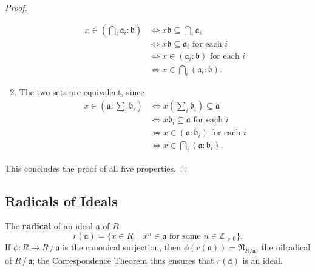 \documentclass[11pt]{article}
\begin{document}
\begin{adjustwidth}{0.5cm}{}
\begin{proof}
\begin{enumerate}
\begin{align*}
				x \in \left( \bigcap_{i} \mathfrak{a}_{i} : \mathfrak{b} \right) &\iff x \mathfrak{b} \subseteq \bigcap\limits_{i} \mathfrak{a}_{i} \\
				&\iff x \mathfrak{b} \subseteq \mathfrak{a}_{i} \text{ for each } i \\
				&\iff x \in (\mathfrak{a}_{i} : \mathfrak{b}) \text{ for each } i \\
				&\iff x \in \bigcap\limits_{i} (\mathfrak{a}_{i} : \mathfrak{b}).
			\end{align*}
			\item The two sets are equivalent, since
			\begin{align*}
				x \in \left( \mathfrak{a} : \sum\limits_{i} \mathfrak{b}_{i} \right) &\iff x \left( \sum\limits_{i} \mathfrak{b}_{i} \right) \subseteq \mathfrak{a} \\
				&\iff x \mathfrak{b}_{i} \subseteq \mathfrak{a} \text{ for each } i \\
				&\iff x \in (\mathfrak{a} : \mathfrak{b}_{i}) \text{ for each } i \\
				&\iff x \in \bigcap\limits_{i} (\mathfrak{a} : \mathfrak{b}_{i}).
			\end{align*}
		\end{enumerate}
		This concludes the proof of all five properties.
	\end{proof}
\end{adjustwidth}


\subsection{Radicals of Ideals}

The \textbf{radical} of an ideal $\mathfrak{a}$ of $R$
\[
	r(\mathfrak{a}) = \{ x \in R \,\mid\, x^{n} \in \mathfrak{a} \text{ for some } n \in \mathbb{Z}_{> 0} \}.
\]
If $\phi : R \to R \,/\, \mathfrak{a}$ is the canonical surjection, then $\phi(r(\mathfrak{a})) = \mathfrak{N}_{R / \mathfrak{a}}$, the nilradical of $R \,/\, \mathfrak{a}$; the Correspondence Theorem thus ensures that $r(\mathfrak{a})$ is an ideal.
\end{document}

